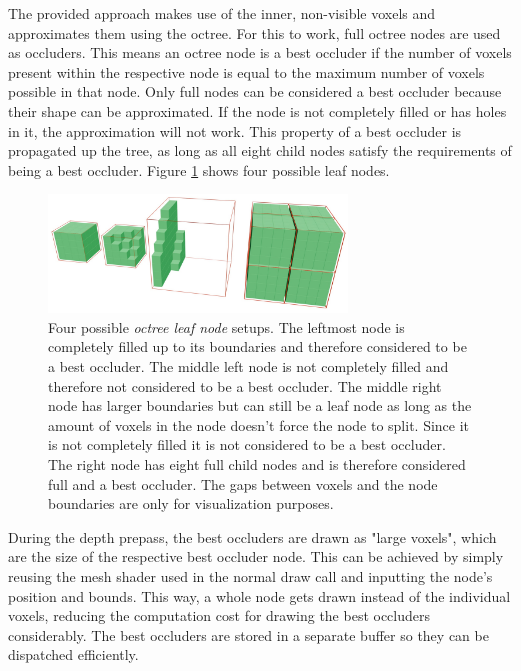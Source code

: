 \noindent
The provided approach makes use of the inner, non-visible voxels and approximates them using the octree. For this 
to work, full octree nodes are used as occluders. This means an octree node is a best occluder if the number of 
voxels present within the respective node is equal to the maximum number of voxels possible in that node. Only full 
nodes can be considered a best occluder because their shape can be approximated. If the node is not completely filled 
or has holes in it, the approximation will not work. This property of a best occluder is propagated up the tree, as 
long as all eight child nodes satisfy the requirements of being a best occluder. Figure 
\ref{fig:octreenode-filled-non-filled} shows four possible leaf nodes. 

\begin{figure}[h]
    \centering
    \includegraphics[width=300px]{images/graphics/octree-nodes-filled.jpg}
    \caption{Four possible \emph{octree leaf node} setups. The leftmost node is completely filled up to its 
    boundaries and therefore considered to be a best occluder. The middle left node is not completely filled 
    and therefore not considered to be a best occluder. The middle right node has larger boundaries but can 
    still be a leaf node as long as the amount of voxels in the node doesn't force the node to split. Since 
    it is not completely filled it is not considered to be a best occluder. The right node has eight full child 
    nodes and is therefore considered full and a best occluder. The gaps between voxels and the node boundaries 
    are only for visualization purposes.}
    \label{fig:octreenode-filled-non-filled}
\end{figure}

\noindent
During the depth prepass, the best occluders are drawn as "large voxels", which are the size of the respective 
best occluder node. This can be achieved by simply reusing the mesh shader used in the normal draw call and 
inputting the node's position and bounds. This way, a whole node gets drawn instead of the individual voxels, 
reducing the computation cost for drawing the best occluders considerably. The best occluders are stored in a 
separate buffer so they can be dispatched efficiently. \\

